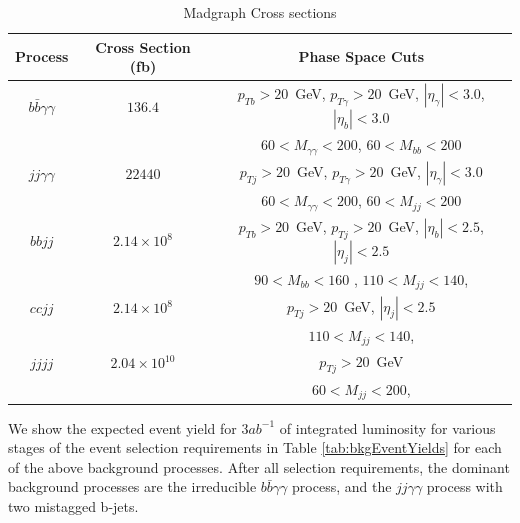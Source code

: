 \documentclass{cmspaper}
\begin{document}
\begin{table}[!ht]
\begin{center} 
\begin{tabular}{|c|c|c|}
\hline
Process                  &   Cross Section (fb)   &  Phase Space Cuts                                         \\  \hline
$b \bar{b} \gamma\gamma$ &   $136.4$              &  $p_{T b} > 20$~GeV, $p_{T \gamma} > 20$~GeV, $|\eta_{\gamma}| < 3.0$, $|\eta_{b}| < 3.0$   \\
                         &                        &  $ 60 < M_{\gamma\gamma} < 200$, $ 60 < M_{bb} < 200$     \\\hline
$jj \gamma\gamma$        &   $22440$              &  $p_{T j} > 20$~GeV, $p_{T \gamma} > 20$~GeV, $|\eta_{\gamma}| < 3.0$    \\
                         &                        &  $ 60 < M_{\gamma\gamma} < 200$, $ 60 < M_{jj} < 200$     \\\hline
$bb jj$                  &   $2.14 \times 10^{8}$ &  $p_{T b} > 20$~GeV, $p_{T j} > 20$~GeV, $|\eta_{b}| < 2.5$, $|\eta_{j}| < 2.5$      \\
                         &                        &  $ 90 < M_{bb} < 160$  , $110 < M_{jj} < 140$,            \\\hline
$cc jj$                  &   $2.14 \times 10^{8}$ &  $p_{T j} > 20$~GeV, $|\eta_{j}| < 2.5$                   \\
                         &                        &  $110 < M_{jj} < 140$,                                    \\\hline
$jjjj$                   &  $2.04 \times 10^{10}$ &  $p_{T j} > 20$~GeV                                       \\
                         &                        &  $60 < M_{jj} < 200$,                                     \\\hline

\end{tabular}
\caption{Madgraph Cross sections }
\label{tab:MadgraphBkgCrossSections}
\end{center}
\end{table}

We show the expected event yield for $3 ab^{-1}$ of integrated luminosity for various stages of the 
event selection requirements in Table \ref{tab:bkgEventYields} for each of the above background processes.
After all selection requirements, the dominant background processes are the irreducible
$b \bar{b} \gamma\gamma$ process, and the $jj \gamma\gamma$ process with two mistagged b-jets.
\end{document}
